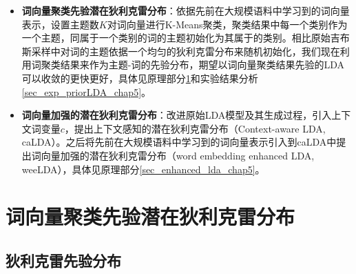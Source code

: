 \documentclass[master]{njuthesis}
\begin{document}
\begin{itemize}
\item \textbf{词向量聚类先验潜在狄利克雷分布}：依据先前在大规模语料中学习到的词向量表示，设置主题数$K$对词向量进行K-Means聚类，聚类结果中每一个类别作为一个主题，同属于一个类别的词的主题初始化为其属于的类别。相比原始吉布斯采样中对词的主题依据一个均匀的狄利克雷分布来随机初始化，我们现在利用词聚类结果来作为主题-词的先验分布，期望以词向量聚类结果先验的LDA可以收敛的更快更好，具体见原理部分\ref{sec_prior_lda_chap5}和实验结果分析\ref{sec_exp_priorLDA_chap5}。
\item \textbf{词向量加强的潜在狄利克雷分布}：改进原始LDA模型及其生成过程，引入上下文词变量$c$，提出上下文感知的潜在狄利克雷分布（Context-aware LDA, caLDA）。之后将先前在大规模语料中学习到的词向量表示引入到caLDA中提出词向量加强的潜在狄利克雷分布（word embedding enhanced LDA, weeLDA），具体见原理部分\ref{sec_enhanced_lda_chap5}。
\end{itemize}


\section{词向量聚类先验潜在狄利克雷分布}\label{sec_prior_lda_chap5}

\subsection{狄利克雷先验分布}\label{subsec_dirichlet_chap5}
\end{document}
